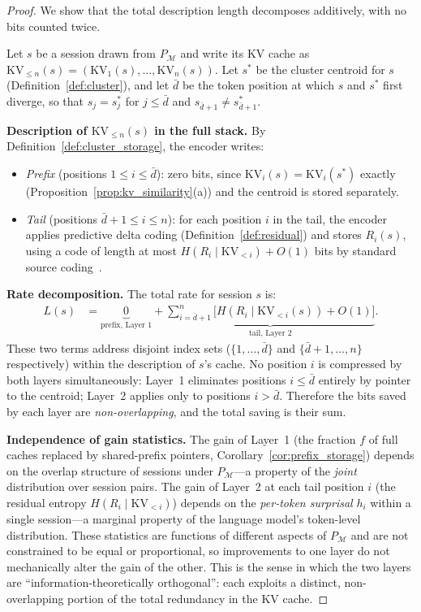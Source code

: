 \documentclass[11pt]{article}
\begin{document}
\begin{proof}
We show that the total description length decomposes additively, with no
bits counted twice.

Let $s$ be a session drawn from $P_{\mathcal{M}}$ and write its KV cache as
$\mathrm{KV}_{\leq n}(s) = (\mathrm{KV}_1(s), \ldots, \mathrm{KV}_n(s))$.
Let $s^*$ be the cluster centroid for $s$ (Definition~\ref{def:cluster}), and
let $\bar{d}$ be the token position at which $s$ and $s^*$ first diverge, so that
$s_j = s^*_j$ for $j \leq \bar{d}$ and $s_{\bar{d}+1} \neq s^*_{\bar{d}+1}$.

\textbf{Description of $\mathrm{KV}_{\leq n}(s)$ in the full stack.}
By Definition~\ref{def:cluster_storage}, the encoder writes:
\begin{itemize}
  \item \emph{Prefix} (positions $1 \leq i \leq \bar{d}$): zero bits, since
        $\mathrm{KV}_i(s) = \mathrm{KV}_i(s^*)$ exactly (Proposition~\ref{prop:kv_similarity}(a))
        and the centroid is stored separately.
  \item \emph{Tail} (positions $\bar{d}+1 \leq i \leq n$): for each position $i$
        in the tail, the encoder applies predictive delta coding
        (Definition~\ref{def:residual}) and stores $R_i(s)$, using a code of
        length at most $H(R_i \mid \mathrm{KV}_{<i}) + O(1)$ bits by standard
        source coding~\cite{cover2006}.
\end{itemize}

\textbf{Rate decomposition.}  The total rate for session $s$ is:
\begin{align*}
  L(s)
  &= \underbrace{0}_{\text{prefix, Layer 1}}
   + \underbrace{\sum_{i=\bar{d}+1}^{n} \bigl[H(R_i \mid \mathrm{KV}_{<i}(s)) + O(1)\bigr]}_{\text{tail, Layer 2}}.
\end{align*}
These two terms address disjoint index sets ($\{1,\ldots,\bar{d}\}$ and $\{\bar{d}+1,\ldots,n\}$
respectively) within the description of $s$'s cache.  No position $i$ is
compressed by both layers simultaneously: Layer~1 eliminates positions
$i \leq \bar{d}$ entirely by pointer to the centroid; Layer~2 applies only to
positions $i > \bar{d}$.  Therefore the bits saved by each layer are
\emph{non-overlapping}, and the total saving is their sum.

\textbf{Independence of gain statistics.}  The gain of Layer~1 (the fraction
$f$ of full caches replaced by shared-prefix pointers, Corollary~\ref{cor:prefix_storage})
depends on the overlap structure of sessions under $P_{\mathcal{M}}$---a
property of the \emph{joint} distribution over session pairs.  The gain of
Layer~2 at each tail position $i$ (the residual entropy $H(R_i \mid \mathrm{KV}_{<i})$)
depends on the \emph{per-token surprisal} $h_i$ within a single session---a
marginal property of the language model's token-level distribution.  These
statistics are functions of different aspects of $P_{\mathcal{M}}$ and are
not constrained to be equal or proportional, so improvements to one layer do
not mechanically alter the gain of the other.  This is the sense in which the
two layers are ``information-theoretically orthogonal'': each exploits a
distinct, non-overlapping portion of the total redundancy in the KV cache.
\end{proof}
\end{document}
